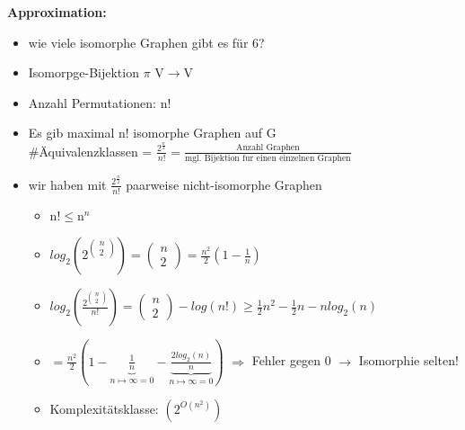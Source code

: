 \newpage
\textbf{Approximation:}
\begin{itemize}
	\item wie viele isomorphe Graphen gibt es für 6?
	\item Isomorpge-Bijektion $\pi$ V$\rightarrow$V
	\item Anzahl Permutationen: n!
	\item Es gib maximal n! isomorphe Graphen auf G\\
	
\hspace*{2cm}\#Äquivalenzklassen = $\frac{2^\frac{n}{2}}{n!}=\frac{\text{Anzahl Graphen}}{\text{mgl. Bijektion fur einen einzelnen Graphen}}$\\
	\item wir haben mit $\frac{2^\frac{n}{2}}{n!}$ paarweise nicht-isomorphe Graphen\\
	\begin{itemize}
		\item n!$\leq$n$^n$
		\item $log_2(2^{\begin{pmatrix}n\\2\end{pmatrix}}) = \begin{pmatrix}n\\2\end{pmatrix} = \frac{n^2}{2}(1-\frac{1}{n})$
		\item $log_2(\frac{2^{\begin{pmatrix}n\\2\end{pmatrix}}}{n!}) = \begin{pmatrix}n\\2\end{pmatrix} - log(n!) \geq \frac{1}{2}n^2-\frac{1}{2}n-n log_2(n)$
		\item $=\frac{n^2}{2}(1-\underbrace{\frac{1}{n}}_{n\mapsto \infty=0}-\underbrace{\frac{2 log_2(n)}{n}}_{n\mapsto \infty=0})$ $\Rightarrow$ Fehler gegen 0 $\rightarrow$ Isomorphie selten!
		\item  Komplexitätsklasse: $(2^{O(n^2)})$
	\end{itemize}
\end{itemize}

